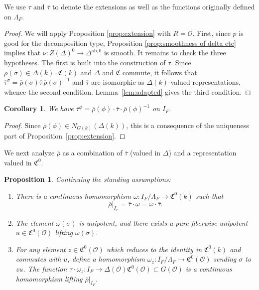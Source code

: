 \documentclass[11pt, letterpaper,english]{amsart}
\theoremstyle{plain}
\newtheorem{proposition}[lem]{Proposition}
\newtheorem{corollary}[lem]{Corollary}
\theoremstyle{definition}
\numberwithin{equation}{section}
\numberwithin{lem}{section}
\newcommand{\fC}{\mathfrak{C}}
\newcommand{\cO}{\mathcal{O}}
\newcommand{\rhobar}{{\overline{\rho}}}
\newcommand{\taubar}{{\overline{\tau}}}
\newcommand{\omegabar}{{\overline{\omega}}}
\newcommand{\ab}{\textrm{ab}}
\newcommand{\nlz}[2]{N_{#1}(#2)}
\newcommand{\Ld}{\Lambda}
\newcommand{\Dt}{\Delta}
\begin{document}
We use $\tau$ and $\taubar$ to denote the extensions as well as the functions originally defined on $\Lambda_F$. 

\begin{proof}
We will apply 
Proposition \ref{prop:extension} with $R=\cO$. 
First, since $p$ is good for the decomposition type, Proposition \ref{prop:smoothness of delta etc} implies that $\nu: Z(\Dt)^0 \to \Dt^{\ab,0}$ is smooth. 
It remains to check the three hypotheses.  The first is built into the construction of $\tau$. Since $\rhobar(\sigma) \in \Dt(k) \cdot \fC(k)$ and $\Dt$ and $\fC$ commute, it follows that $\taubar^{\sigma}=\rhobar(\sigma) \taubar \, \rhobar(\sigma)^{-1}$ and $\taubar$ are isomorphic as $\Dt(k)$-valued representations, whence the second condition. Lemma~\ref{lem:adapted} gives the third condition.
\end{proof}

\begin{corollary} \label{cor:conjugation}
We have
$\taubar^{\phi}=\rhobar(\phi) \cdot \taubar \cdot \rhobar(\phi)^{-1}$ on $I_F$.
\end{corollary}

\begin{proof}
Since $\rhobar(\phi) \in \nlz{G(k)}{\Dt(k)}$,
this is a consequence of the uniqueness part of Proposition~\ref{prop:extension}.
\end{proof}

We next analyze $\rhobar$ as a combination of $\taubar$ (valued in $\Delta$) and a representation valued in $\fC^0$.

\begin{proposition}\label{prop:omega} 
Continuing the standing assumptions:
\begin{enumerate}
    \item There is a continuous homomorphism 
$\omegabar: I_F/\Ld_F \to \fC^0(k)$
such that 
\[ \rhobar|_{I_F}=\taubar \cdot \omegabar = \omegabar \cdot \taubar. \]
\item  The element $\omegabar(\sigma)$ is unipotent, and there exists a pure fiberwise unipotent $u \in \fC^0(\cO)$ lifting $\omegabar(\sigma)$.  

\item  For any element $z \in \fC^0(\cO)$ which reduces to the identity in $\fC^0(k)$ and commutes with $u$, define a homomorphism $\omega_z : I_F / \Lambda_F \to \fC^0(\cO)$ sending $\sigma$ to $z u$.
 The function $ \tau \cdot \omega_z : I_F \to \Delta(\cO) \fC^0(\cO) \subset G(\cO)$ is a continuous homomorphism lifting $\overline{\rho}|_{I_F}$.
\end{enumerate}
\end{proposition}
\end{document}

